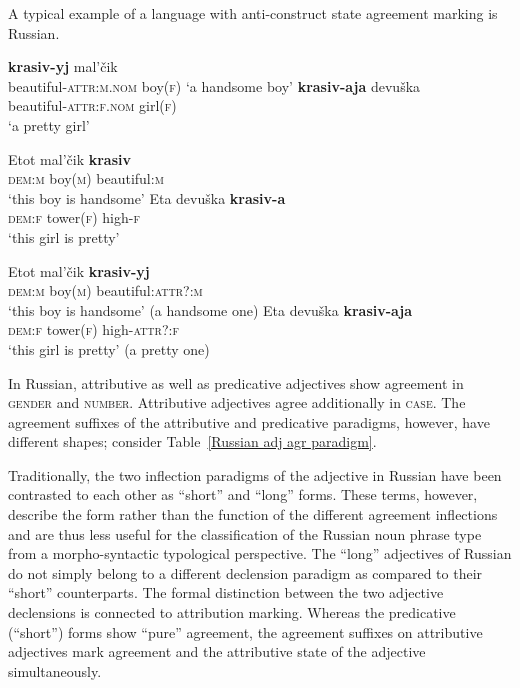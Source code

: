 A typical example of a language with anti\hyp{}construct state agreement marking is Russian.
\begin{exe}
\ex
\label{ru-anti}
\begin{xlist}
\begin{xlist}
\ex	\textbf{krasiv-yj}			mal'čik\\
	beautiful-\textsc{attr:m.nom} 	boy(\textsc{f})
\glt	‘a handsome boy’
\ex
\gll 	\textbf{krasiv-aja} 			devuška\\
	beautiful-\textsc{attr:f.nom}	girl(\textsc{f})\\
\glt	 ‘a pretty girl’
\end{xlist}
\begin{xlist}
\ex
\gll 	Etot 			mal'čik		\textbf{krasiv}\\
	\textsc{dem:m} boy(\textsc{m}) 	beautiful:\textsc{m}\\
\glt	 ‘this boy is handsome’
\ex	
\gll	Eta 			devuška		\textbf{krasiv-a}\\
	\textsc{dem:f} tower(\textsc{f}) 	high-\textsc{f}\\
\glt	‘this girl is pretty’
\end{xlist}
\begin{xlist}
\ex
\gll 	Etot 			mal'čik		\textbf{krasiv-yj}\\
	\textsc{dem:m} boy(\textsc{m}) 	beautiful:\textsc{attr?:m}\\
\glt	 ‘this boy is handsome’ (a handsome one)
\ex	
\gll	Eta 			devuška		\textbf{krasiv-aja}\\
	\textsc{dem:f} tower(\textsc{f}) 	high-\textsc{attr?:f}\\
\glt	‘this girl is pretty’ (a pretty one)
\end{xlist}
\end{xlist}
\end{exe}
In Russian, attributive as well as predicative adjectives show agreement in \textsc{gender} and \textsc{number}. Attributive adjectives agree additionally in \textsc{case}. The agreement suffixes of the attributive and predicative paradigms, however, have different shapes; consider Table~\ref{Russian adj agr paradigm}.

Traditionally, the two inflection paradigms of the adjective in Russian have been contrasted to each other as “short” and “long” forms. These terms, however, describe the form rather than the function of the different agreement inflections and are thus less useful for the classification of the Russian noun phrase type from a morpho-syntactic typological perspective. The “long” adjectives of Russian do not simply belong to a different declension paradigm as compared to their “short” counterparts. The formal distinction between the two adjective declensions is connected to attribution marking. Whereas the predicative (“short”) forms show “pure” agreement, the agreement suffixes on attributive adjectives mark agreement and the attributive state of the adjective simultaneously.

